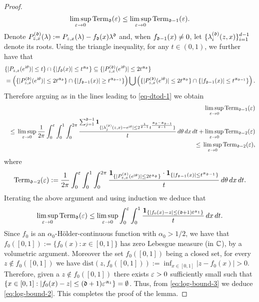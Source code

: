 \documentclass{amsart}
\numberwithin{equation}{section}
\begin{document}
\begin{proof}
\begin{equation}
\limsup_{\varepsilon \to 0} \mathrm{Term}_{\mathfrak{d}}(\varepsilon) \le \limsup_{\varepsilon \to 0} \mathrm{Term}_{\mathfrak{d}-1}(\varepsilon).
\end{equation}
Denote $P^{(\mathfrak{d})}_{z,x}(\lambda):= P_{z,x}(\lambda) - f_{\mathfrak{d}}(x) \lambda^{\mathfrak{d}}$
and, when $f_{\mathfrak{d}-1}(x)\neq 0$,
let $\{\lambda_i^{(\mathfrak{d})}(z,x)\}_{i=1}^{d-1}$
denote its roots.
Using the triangle inequality, for any $t \in (0,1)$, we further have that
\begin{align*}
  &\{ |P_{z,x}(e^{\mathrm{i}\theta})| \le t \}\cap
  \{ |f_{\mathfrak{d}}(x)| \le t^{\upalpha_{\mathfrak{d}}}\}  \subseteq
  \{|P^{(\mathfrak{d})}_{z,x}(e^{\mathrm{i}\theta})| \le
  2t^{\upalpha_{\mathfrak{d}}} \}\\
  & =
\left(\{|P^{(\mathfrak{d})}_{z,x}(e^{\mathrm{i}\theta})| \le
2t^{\upalpha_{\mathfrak{d}}}\}\cap \{|f_{\mathfrak{d}-1}(x)| \ge t^{\upalpha_{\mathfrak{d}-1}}\}\right)
\bigcup
\left(\{|P^{(\mathfrak{d})}_{z,x}(e^{\mathrm{i}\theta})| \le 2t^{\upalpha_{\mathfrak{d}}}\}
\cap \{|f_{\mathfrak{d}-1}(x)| \le t^{\upalpha_{\mathfrak{d}-1}}\}\right).
\end{align*}
Therefore arguing as in the lines leading to \eqref{eq-dtod-1} we obtain
\begin{eqnarray*}
&& \limsup_{\varepsilon \to 0} \mathrm{Term}_{\mathfrak{d}-1}(\varepsilon) \\
&&\le  \,  \limsup_{\varepsilon \to 0} \frac{1}{2 \pi}\int_0^\varepsilon
\int_{0}^1 \int_0^{2 \pi}  \frac{\sum_{j=1}^{\mathfrak{d}-1} {\bf 1}_{\{
 |\lambda_j^{(\mathfrak{d})}(z,x)-e^{\mathrm{i} \theta}| \le
 2^{\frac{1}{\mathfrak{d}-1}}t^{\frac{\upalpha_{\mathfrak{d}}-\upalpha_{\mathfrak{d}-1}}{\mathfrak{d}-1}}\}}}{t} \, d\theta \, d x \, dt + \limsup_{\varepsilon \to 0}\mathrm{Term}_{\mathfrak{d}-2}(\varepsilon)\\
&&\le  \, \limsup_{\varepsilon \to 0}\mathrm{Term}_{\mathfrak{d}-2}(\varepsilon),
\end{eqnarray*}
where
\[
\mathrm{Term}_{\mathfrak{d}-2}(\varepsilon) :=
\frac{1}{2 \pi}\int_0^\varepsilon \int_{0}^1 \int_0^{2 \pi}
\frac{{\bf 1}_{\{ |P_{z,x}^{(\mathfrak{d})}(e^{\mathrm{i}\theta})|
\le 2t^{\upalpha_{\mathfrak{d}}} \}}\cdot {\bf 1}_{\{ |f_{\mathfrak{d}-1}(x)| \le t^{\upalpha_{\mathfrak{d}-1}}\}}}{t} \, d\theta \, d x \, dt.
\]
Iterating the above argument and using induction we deduce that
\begin{equation}\label{eq:log-bound-3}
\limsup_{\varepsilon \to 0} \mathrm{Term}_{\mathfrak{d}}(\varepsilon) \le \limsup_{\varepsilon \to 0}
\int_0^\varepsilon \int_0^1 \frac{{\bf 1}_{\{ |f_0(x)-z| \le (\mathfrak{d}+1)t^{\upalpha_1}
\}}}{t} \, dx \, dt.
\end{equation}
Since $f_0$ is an $\alpha_0$-H\"{o}lder-continuous function
with $\alpha_0 >1/2$, we have that
$f_0([0,1]):= \{f_0(x): x \in [0,1]\} $ has zero Lebesgue measure (in $\mathbb{C}$),
by a volumetric argument.
Moreover the set $f_0([0,1])$ being a closed set, for every $z \notin f_0([0,1])$ we have $\mathrm{dist}(z, f_0([0,1])) := \inf_{x \in [0,1]} |z -f_0(x)| >0$. Therefore,
given a $z \notin f_0([0,1])$ there exists $\varepsilon>0$ sufficiently small such that $\{x \in [0,1]: |f_0(x) -z| \le (\mathfrak{d}+1) \varepsilon^{\upalpha_1}\}=\emptyset$. Thus, from \eqref{eq:log-bound-3} we deduce \eqref{eq:log-bound-2}. This completes the proof of the lemma.
\end{proof}
\end{document}
